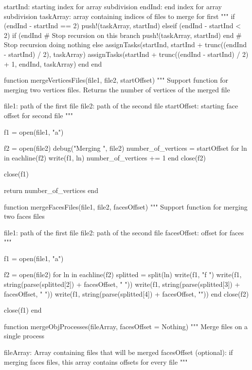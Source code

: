 \documentclass[11pt,oneside]{article}	%
\begin{document}
{  startInd: starting index for array subdivision
  endInd: end index for array subdivision
  taskArray: array containing indices of files to merge for first
  """
  if (endInd - startInd == 2)
    push!(taskArray, startInd)
  elseif (endInd - startInd < 2)
    if (endInd %
      # Stop recursion on this branch
      push!(taskArray, startInd)
    end
    # Stop recursion doing nothing
  else
    assignTasks(startInd, startInd + trunc((endInd - startInd) / 2), taskArray)
    assignTasks(startInd + trunc((endInd - startInd) / 2) + 1, endInd, taskArray)
  end
end

function mergeVerticesFiles(file1, file2, startOffset)
  """
  Support function for merging two vertices files.
  Returns the number of vertices of the merged file

  file1: path of the first file
  file2: path of the second file
  startOffset: starting face offset for second file
  """

  f1 = open(file1, "a")
  
  f2 = open(file2)
  debug("Merging ", file2)
  number_of_vertices = startOffset
  for ln in eachline(f2)
    write(f1, ln)
    number_of_vertices += 1
  end
  close(f2)

  close(f1)

  return number_of_vertices
end


function mergeFacesFiles(file1, file2, facesOffset)
  """
  Support function for merging two faces files

  file1: path of the first file
  file2: path of the second file
  facesOffset: offset for faces
  """

  f1 = open(file1, "a")

  f2 = open(file2)
  for ln in eachline(f2)
    splitted = split(ln)
    write(f1, "f ")
    write(f1, string(parse(splitted[2]) + facesOffset, " "))
    write(f1, string(parse(splitted[3]) + facesOffset, " "))
    write(f1, string(parse(splitted[4]) + facesOffset, "\n"))
  end
  close(f2)

  close(f1)
end

function mergeObjProcesses(fileArray, facesOffset = Nothing)
  """
  Merge files on a single process

  fileArray: Array containing files that will be merged
  facesOffset (optional): if merging faces files, this array contains
    offsets for every file
  """

}
\end{document}
